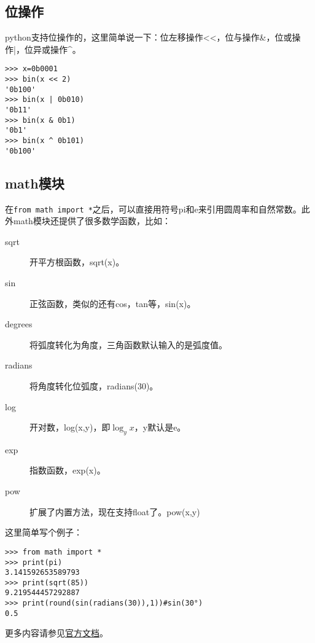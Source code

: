 \documentclass[12pt,oneside]{book}
\begin{document}
\begin{common-format}
\subsection{位操作}
python支持位操作的，这里简单说一下：位左移操作<<，位与操作\&{}，位或操作|，位异或操作\^{}。
\begin{Verbatim}
>>> x=0b0001
>>> bin(x << 2)
'0b100'
>>> bin(x | 0b010)
'0b11'
>>> bin(x & 0b1)
'0b1'
>>> bin(x ^ 0b101)
'0b100'
\end{Verbatim}




\subsection{math模块}
在\verb+from math import *+之后，可以直接用符号pi和e来引用圆周率和自然常数。此外math模块还提供了很多数学函数，比如：
\begin{description}
\item[sqrt] 开平方根函数，sqrt(x)。
\item[sin] 正弦函数，类似的还有cos，tan等，sin(x)。
\item[degrees] 将弧度转化为角度，三角函数默认输入的是弧度值。
\item[radians] 将角度转化位弧度，radians(30)。 
\item[log] 开对数，log(x,y)，即$\log_y x$，y默认是e。
\item[exp] 指数函数，exp(x)。
\item[pow] 扩展了内置方法，现在支持float了。pow(x,y)
\end{description}

这里简单写个例子：
\begin{Verbatim}
>>> from math import *
>>> print(pi)
3.141592653589793
>>> print(sqrt(85))
9.219544457292887
>>> print(round(sin(radians(30)),1))#sin(30°)
0.5
\end{Verbatim}

\begin{large}
更多内容请参见\href{http://docs.python.org/3.4/library/math.html}{官方文档}。
\end{large}




\end{common-format}
\end{document}
